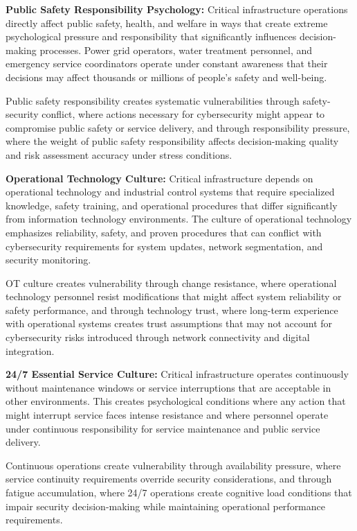 \documentclass[10pt, twocolumn]{article}
\begin{document}
\textbf{Public Safety Responsibility Psychology:} Critical infrastructure operations directly affect public safety, health, and welfare in ways that create extreme psychological pressure and responsibility that significantly influences decision-making processes. Power grid operators, water treatment personnel, and emergency service coordinators operate under constant awareness that their decisions may affect thousands or millions of people's safety and well-being.

Public safety responsibility creates systematic vulnerabilities through safety-security conflict, where actions necessary for cybersecurity might appear to compromise public safety or service delivery, and through responsibility pressure, where the weight of public safety responsibility affects decision-making quality and risk assessment accuracy under stress conditions.

\textbf{Operational Technology Culture:} Critical infrastructure depends on operational technology and industrial control systems that require specialized knowledge, safety training, and operational procedures that differ significantly from information technology environments. The culture of operational technology emphasizes reliability, safety, and proven procedures that can conflict with cybersecurity requirements for system updates, network segmentation, and security monitoring.

OT culture creates vulnerability through change resistance, where operational technology personnel resist modifications that might affect system reliability or safety performance, and through technology trust, where long-term experience with operational systems creates trust assumptions that may not account for cybersecurity risks introduced through network connectivity and digital integration.

\textbf{24/7 Essential Service Culture:} Critical infrastructure operates continuously without maintenance windows or service interruptions that are acceptable in other environments. This creates psychological conditions where any action that might interrupt service faces intense resistance and where personnel operate under continuous responsibility for service maintenance and public service delivery.

Continuous operations create vulnerability through availability pressure, where service continuity requirements override security considerations, and through fatigue accumulation, where 24/7 operations create cognitive load conditions that impair security decision-making while maintaining operational performance requirements.
\end{document}
